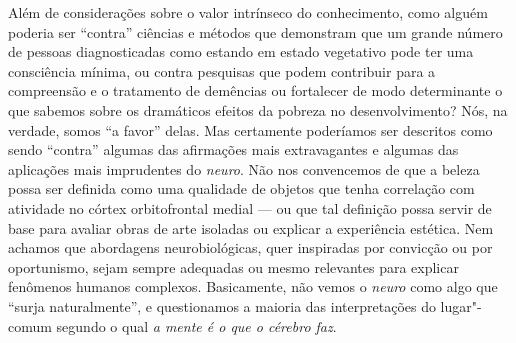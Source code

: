 Além de considerações sobre o valor intrínseco do conhecimento, como
alguém poderia ser ``contra'' ciências e métodos que demonstram que um
grande número de pessoas diagnosticadas como estando em estado
vegetativo pode ter uma consciência mínima, ou contra pesquisas que
podem contribuir para a compreensão e o tratamento de demências ou
fortalecer de modo determinante o que sabemos sobre os dramáticos
efeitos da pobreza no desenvolvimento? Nós, na verdade, somos ``a
favor'' delas. Mas certamente poderíamos ser descritos como sendo
``contra'' algumas das afirmações mais extravagantes e algumas das
aplicações mais imprudentes do \emph{neuro}. Não nos convencemos de que
a beleza possa ser definida como uma qualidade de objetos que tenha
correlação com atividade no córtex orbitofrontal medial --- ou que tal
definição possa servir de base para avaliar obras de arte isoladas ou
explicar a experiência estética. Nem achamos que abordagens
neurobiológicas, quer inspiradas por convicção ou por oportunismo, sejam
sempre adequadas ou mesmo relevantes para explicar fenômenos humanos
complexos. Basicamente, não vemos o \emph{neuro} como algo que ``surja
naturalmente'', e questionamos a maioria das interpretações do
lugar"-comum segundo o qual \emph{a mente é o que o cérebro faz}.

